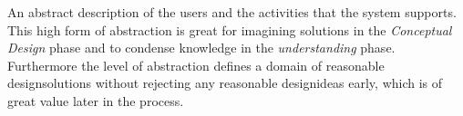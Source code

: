 \begin{tool} \label{tool:conceptual_scenario} 
  An abstract description of the users and the activities that the system supports. This high form of abstraction is great for imagining solutions in the \emph{Conceptual Design} phase and to condense knowledge in the \emph{understanding} phase. Furthermore the level of abstraction defines a domain of reasonable designsolutions without rejecting any reasonable designideas early, which is of great value later in the process. \cite[p. 63]{benyon_14}
\end{tool}
